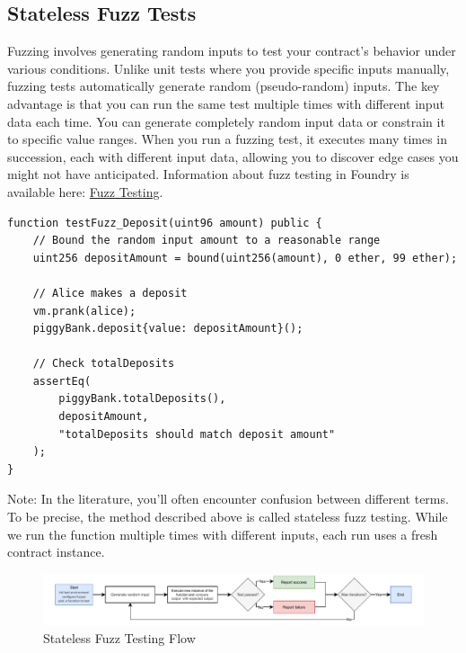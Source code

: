 \documentclass[12pt]{article}
\begin{document}
\subsection{Stateless Fuzz Tests}
Fuzzing involves generating random inputs to test your contract's behavior
under various conditions. Unlike unit tests where you provide specific inputs
manually, fuzzing tests automatically generate random (pseudo-random) inputs.
The key advantage is that you can run the same test multiple times with
different input data each time. You can generate completely random input data
or constrain it to specific value ranges. When you run a fuzzing test, it
executes many times in succession, each with different input data, allowing you
to discover edge cases you might not have anticipated. Information about fuzz
testing in Foundry is available here:
\href{https://book.getfoundry.sh/forge/fuzz-testing}{Fuzz Testing}.

\noindent \begin{minipage}{\textwidth}
    \begin{lstlisting}[language=Solidity]
function testFuzz_Deposit(uint96 amount) public {
    // Bound the random input amount to a reasonable range
    uint256 depositAmount = bound(uint256(amount), 0 ether, 99 ether);
    
    // Alice makes a deposit
    vm.prank(alice);
    piggyBank.deposit{value: depositAmount}();
    
    // Check totalDeposits
    assertEq(
        piggyBank.totalDeposits(),
        depositAmount,
        "totalDeposits should match deposit amount"
    );
}
\end{lstlisting}
\end{minipage}

\noindent
Note: In the literature, you'll often encounter confusion between different terms. To be precise, the method described above is called stateless fuzz testing. While we run the function multiple times with different inputs, each run uses a fresh contract instance.

\begin{figure}[h!]
    \centering
    \includegraphics[width=1\textwidth]{fuzz-testing.pdf}
    \caption{Stateless Fuzz Testing Flow}\label{fig:fuzz-testing}
\end{figure}
\end{document}
